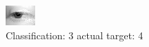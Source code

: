 \begin{figure}[h!]
\begin{center}
\includegraphics[width=0.60\columnwidth]{figures/ID2705_class_3_target_4.png}
\end{center}
\caption{ Classification: 3 actual target: 4}
\label{fig:ID2705_class_3_target_4}
\end{figure}
